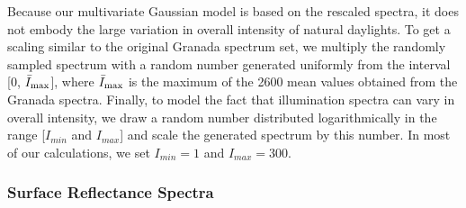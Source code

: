 \documentclass{jov}
\begin{document}
Because our multivariate Gaussian model is based on the rescaled spectra, it does not embody the large variation in overall intensity of natural daylights.
To get a scaling similar to the original Granada spectrum set, we multiply the randomly sampled spectrum with a random number generated uniformly from the interval [0, $\bar{I}_{\rm max}$], where $\bar{I}_{\rm max}$ is the maximum of the 2600 mean values obtained from the Granada spectra. Finally, to model the fact that illumination spectra can vary in overall intensity, we draw a random number distributed logarithmically in the range [$I_{min}$ and $I_{max}$] and scale the generated spectrum by this number.
In most of our calculations, we set $I_{min} = 1$ and $I_{max} = 300$.

\subsubsection{Surface Reflectance Spectra}
\end{document}
